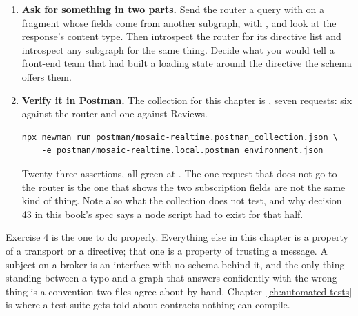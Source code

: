 \begin{enumerate}
  \item \textbf{Ask for something in two parts.} Send the router a query with
   on a fragment whose fields come from another subgraph, with
  , and look at the response's content type. Then
  introspect the router for its directive list and introspect any subgraph for
  the same thing. Decide what you would tell a front-end team that had built a
  loading state around the directive the schema offers them.

  \item \textbf{Verify it in Postman.} The collection for this chapter is
  , seven requests: six against the router and
  one against Reviews.

  \begin{verbatim}
npx newman run postman/mosaic-realtime.postman_collection.json \
    -e postman/mosaic-realtime.local.postman_environment.json
  \end{verbatim}

  Twenty-three assertions, all green at . The one request that does
  not go to the router is the one that shows the two subscription fields are
  not the same kind of thing. Note also what the collection does not test, and
  why decision 43 in this book's spec says a node script had to exist for that
  half.
\end{enumerate}

Exercise 4 is the one to do properly. Everything else in this chapter is a
property of a transport or a directive; that one is a property of trusting a
message. A subject on a broker is an interface with no schema behind it, and
the only thing standing between a typo and a graph that answers confidently
with the wrong thing is a convention two files agree about by hand.
Chapter~\ref{ch:automated-tests} is where a test suite gets told about
contracts nothing can compile.

